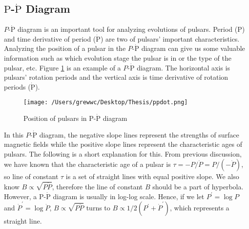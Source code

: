 \documentclass[12pt]{report}
\begin{document}
        \subsection{$\mbox{P}$-$\dot{\mbox{P}}$ Diagram} 
          $P$-$\dot{\mbox{P}}$ diagram is an important tool for analyzing evolutions of 
          pulsars. Period ($\mbox{P}$) and time derivative of period ($\dot{\mbox{P}}$) are 
          two of pulsars' important characteristics. Analyzing the position of a pulsar in 
          the $P$-$\dot{\mbox{P}}$ diagram can give us some valuable information such as 
          which evolution stage the pulsar is in or the type of the pulsar, etc. 
          Figure \ref{fig:p-pdot} is an example of a $P$-$\dot{\mbox{P}}$ diagram. 
          The horizontal axis is pulsars' rotation periods and the vertical axis is time 
          derivative of rotation periods ($\dot{\mbox{P}}$).
          \begin{figure}[h]
              \centering
              \texttt{[image: /Users/grewwc/Desktop/Thesis/ppdot.png]}
              \caption{\protect Position of pulsars in $\mbox{P}$-$\dot{\mbox{P}}$ diagram}
              \label{fig:p-pdot}
          \end{figure}
          In this $P$-$\dot{\mbox{P}}$ diagram, the negative slope lines represent the strengths 
          of surface magnetic fields while the positive slope lines represent the characteristic 
          ages of pulsars. The following is a short explanation for this. 
          From previous discussion, we have known that the 
          characteristic age of a pulsar is $\tau=-P/\dot{P}=P/(-\dot{P})$, so line of constant 
          $\tau$ is a set of straight lines with equal positive slope. We also know 
          $B\propto\sqrt{P\dot{P}}$, therefore the line of constant $B$ should be a part 
          of hyperbola. However, a $\mbox{P}$-$\dot{\mbox{P}}$ diagram is usually in log-log 
          scale. Hence, if we let $P^{\prime}=\log{P}$ and $\dot{P}^{\prime}=\log{\dot{P}}$,
          $B\propto\sqrt{P\dot{P}}$ turns to 
          $B\propto 1/2 \left(P^{\prime} + \dot{P}^{\prime}\right)$, 
          which represents a straight line.
\end{document}
